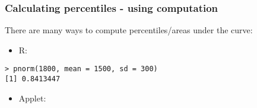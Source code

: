 \documentclass[slidestop,compress,mathserif]{beamer}
\begin{document}

\begin{frame}[fragile]
\frametitle{Calculating percentiles - using computation}

There are many ways to compute percentiles/areas under the curve:

\begin{itemize}
\item R:
\end{itemize}
\begin{beamerboxesrounded}[shadow = false, lower = code body]{}
{\small \begin{verbatim}
> pnorm(1800, mean = 1500, sd = 300)
[1] 0.8413447
\end{verbatim}
}
\end{beamerboxesrounded}
\begin{itemize}
\item Applet: {\small {}}
\begin{center}
\end{center}

\end{itemize}


\end{frame}

\end{document}

